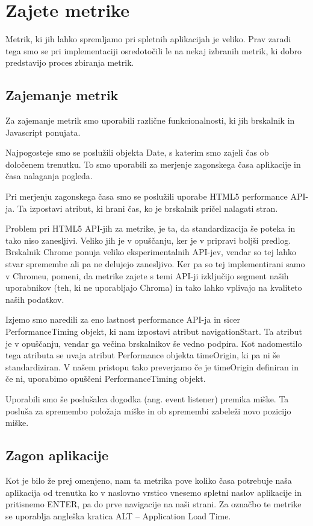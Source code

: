 \documentclass[a4paper, 12pt]{book}
\begin{document}
\chapter{Zajete metrike}
\label{ch2}

Metrik, ki jih lahko spremljamo pri spletnih aplikacijah je veliko. Prav zaradi tega smo se pri implementaciji osredotočili le na nekaj izbranih metrik, ki dobro predstavijo proces zbiranja metrik. 

\section{Zajemanje metrik}

Za zajemanje metrik smo uporabili različne funkcionalnosti, ki jih brskalnik in Javascript ponujata.

Najpogosteje smo se poslužili objekta Date, s katerim smo zajeli čas ob določenem trenutku. To smo uporabili za merjenje zagonskega časa aplikacije in časa nalaganja pogleda.

Pri merjenju zagonskega časa smo se poslužili uporabe HTML5 performance API-ja. Ta izpostavi atribut, ki hrani čas, ko je brskalnik pričel nalagati stran.

Problem pri HTML5 API-jih za metrike, je ta, da standardizacija še poteka in tako niso zanesljivi. Veliko jih je v opuščanju, ker je v pripravi boljši predlog. Brskalnik Chrome ponuja veliko eksperimentalnih API-jev, vendar so tej lahko stvar spremembe ali pa ne delujejo zanesljivo. Ker pa so tej implementirani samo v Chromeu, pomeni, da metrike zajete s temi API-ji izključijo segment naših uporabnikov (teh, ki ne uporabljajo Chroma) in tako lahko vplivajo na kvaliteto naših podatkov.

Izjemo smo naredili za eno lastnost performance API-ja in sicer PerformanceTiming objekt, ki nam izpostavi atribut navigationStart. Ta atribut je v opuščanju, vendar ga večina brskalnikov še vedno podpira. Kot nadomestilo tega atributa se uvaja atribut Performance objekta timeOrigin, ki pa ni še standardiziran. V našem pristopu tako preverjamo če je timeOrigin definiran in če ni, uporabimo opuščeni PerformanceTiming objekt.

Uporabili smo še poslušalca dogodka (ang. event listener) premika miške. Ta posluša za spremembo položaja miške in ob spremembi zabeleži novo pozicijo miške.

\section{Zagon aplikacije}
\label{ch2:sec1}
Kot je bilo že prej omenjeno, nam ta metrika pove koliko časa potrebuje naša aplikacija od trenutka ko v naslovno vrstico vnesemo spletni naslov aplikacije in pritisnemo ENTER, pa do prve navigacije na naši strani. Za označbo te metrike se uporablja angleška kratica ALT – Application Load Time.
\end{document}
